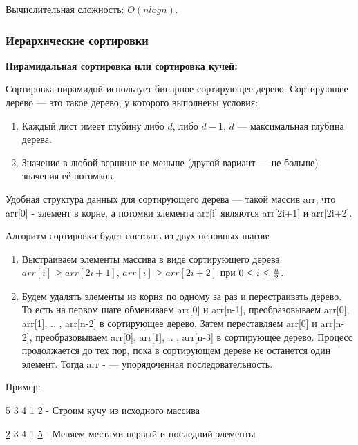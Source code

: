 \documentclass[12pt]{matmex-diploma}
\begin{document}
            Вычислительная сложность: $O(nlogn)$.
            
        \subsubsection*{Иерархические сортировки}
            
            \textbf{Пирамидальная сортировка или сортировка кучей:}
            
            Сортировка пирамидой использует бинарное сортирующее дерево. Сортирующее дерево — это такое дерево, у которого выполнены условия:
            \begin{enumerate}
                \item Каждый лист имеет глубину либо $d$, либо $d-1$, $d$ — максимальная глубина дерева.
                \item Значение в любой вершине не меньше (другой вариант — не больше) значения её потомков.
            \end{enumerate}
            
            Удобная структура данных для сортирующего дерева — такой массив arr, что arr[0] - элемент в корне, а потомки элемента arr[i] являются arr[2i+1] и arr[2i+2].
            
            Алгоритм сортировки будет состоять из двух основных шагов:
            \begin{enumerate}
                \item Выстраиваем элементы массива в виде сортирующего дерева: $arr[i] \geq arr[2i+1]$, $arr[i] \geq arr[2i+2]$ при $0 \leq i \leq {n \over 2}$. 
                \item Будем удалять элементы из корня по одному за раз и перестраивать дерево. То есть на первом шаге обмениваем arr[0] и arr[n-1], преобразовываем arr[0], arr[1], .. , arr[n-2] в сортирующее дерево. Затем переставляем arr[0] и arr[n-2], преобразовываем arr[0], arr[1], .. , arr[n-3] в сортирующее дерево. Процесс продолжается до тех пор, пока в сортирующем дереве не останется один элемент. Тогда arr - — упорядоченная последовательность.
            \end{enumerate}
            
            Пример:
            
            5 3 4 1 2   - Строим кучу из исходного массива
            
            \underline{2} 3 4 1 \underline{5}   - Меняем местами первый и последний элементы
            
\end{document}

